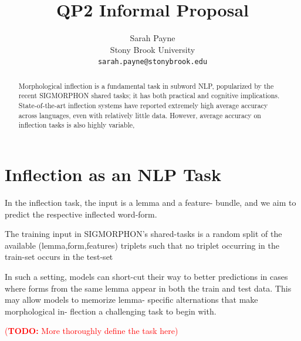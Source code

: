 \documentclass[11pt]{article}
\title{QP2 Informal Proposal}
\author{Sarah Payne \\
  Stony Brook University \\
  \texttt{sarah.payne@stonybrook.edu} }
\newcommand{\todo}[1]{\textcolor{red}{(\textbf{TODO:} #1)}}
\begin{document}
\maketitle
\begin{abstract}
Morphological inflection is a fundamental task in subword NLP, popularized by the recent SIGMORPHON shared tasks; it has both practical and cognitive implications. 
State-of-the-art inflection systems have reported extremely high average accuracy across languages, even with relatively little data. 
However, average accuracy on inflection tasks is also highly variable, 



\end{abstract}



\section{Inflection as an NLP Task}
In the inflection task, the input is a lemma and a feature- bundle, and we aim to predict the respective inflected word-form.

The training input in SIGMORPHON’s shared-tasks is a random split of the available (lemma,form,features) triplets such that no triplet occurring in the train-set occurs in the test-set

\citet{goldman-etal-2022-un} In such a setting, models can short-cut their way to better predictions in cases where forms from the same lemma appear in both the train and test data. This may allow models to memorize lemma- specific alternations that make morphological in- flection a challenging task to begin with. 



\todo{More thoroughly define the task here}
\end{document}
